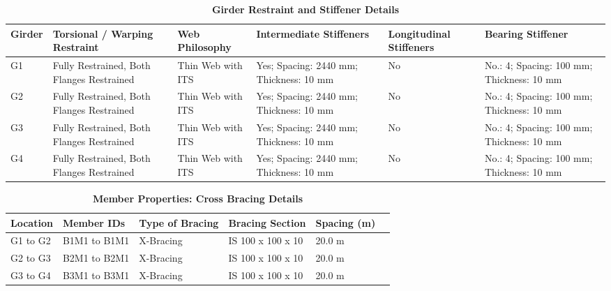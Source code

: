 \documentclass[12pt,a4paper]{report}
\numberwithin{table}{chapter}
\numberwithin{figure}{chapter}
\begin{document}
\vspace{4pt}
\begin{longtable}{|L{1.4cm}|p{2.2cm}|p{2.2cm}|p{3.0cm}|p{2.4cm}|p{2.2cm}|}
\caption{\textbf{Girder Restraint and Stiffener Details}}\\
\hline
\textbf{Girder} & \textbf{Torsional / Warping Restraint} & \textbf{Web Philosophy} & \textbf{Intermediate Stiffeners} & \textbf{Longitudinal Stiffeners} & \textbf{Bearing Stiffener} \\[6pt]
\hline
\endfirsthead
\endhead

G1 & Fully Restrained, Both Flanges Restrained & Thin Web with ITS & Yes; Spacing: 2440 mm; Thickness: 10 mm & No & No.: 4; Spacing: 100 mm; Thickness: 10 mm \\[8pt]
\hline
G2 & Fully Restrained, Both Flanges Restrained & Thin Web with ITS & Yes; Spacing: 2440 mm; Thickness: 10 mm & No & No.: 4; Spacing: 100 mm; Thickness: 10 mm \\[8pt]
\hline
G3 & Fully Restrained, Both Flanges Restrained & Thin Web with ITS & Yes; Spacing: 2440 mm; Thickness: 10 mm & No & No.: 4; Spacing: 100 mm; Thickness: 10 mm \\[8pt]
\hline
G4 & Fully Restrained, Both Flanges Restrained & Thin Web with ITS & Yes; Spacing: 2440 mm; Thickness: 10 mm & No & No.: 4; Spacing: 100 mm; Thickness: 10 mm \\[8pt]
\hline
\end{longtable}



\newpage

\vspace{0.4em}
\setlength{\tabcolsep}{4pt}
\setlength\LTleft{0pt}
\setlength\LTright{\fill}

\begin{longtable}{|L{2.2cm}|L{2.2cm}|L{3.0cm}|L{2.5cm}|C{1.8cm}|C{1.8cm}|}
\caption{\textbf{Member Properties: Cross Bracing Details}}
\hline
\textbf{Location} & \textbf{Member IDs} & \textbf{Type of Bracing} & \textbf{Bracing Section} & \textbf{Spacing (m)} \\
\hline
G1 to G2 & B1M1 to B1M1 & X-Bracing & IS 100 x 100 x 10 & 20.0 m \\[6pt]
\hline
G2 to G3 & B2M1 to B2M1 & X-Bracing & IS 100 x 100 x 10 & 20.0 m \\[6pt]
\hline
G3 to G4 & B3M1 to B3M1 & X-Bracing & IS 100 x 100 x 10 & 20.0 m \\[6pt]
\hline
\end{longtable}

\vspace{0.4em}
\noindent
\setlength{\tabcolsep}{4pt}
\setlength\LTleft{0pt}
\setlength\LTright{\fill}
\end{document}

